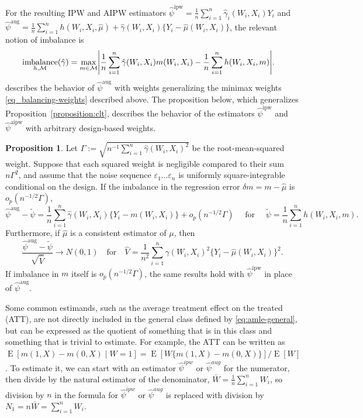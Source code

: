 \documentclass{article}
\DeclarePairedDelimiter\abs{\lvert}{\rvert}
\theoremstyle{definition}
\newtheorem{proposition}[theorem]{Proposition}
\DeclareMathOperator{\E}{E}
\newcommand{\calM}{\ensuremath{\mathcal{M}}}
\DeclareMathOperator{\imbalance}{imbalance}
\newcommand{\hgamma}{\ensuremath{\hat\gamma}}
\newcommand{\aug}{\text{aug}}
\newcommand{\<}{\langle}
\renewcommand{\>}{\rangle}
\begin{document}
For the resulting IPW and AIPW estimators $\hat\psi^{\text{ipw}} = \frac{1}{n}\sum_{i=1}^n  \hat\gamma_i(W_i,X_i) Y_i$ and $\hat\psi^{\text{aug}} = \frac{1}{n}\sum_{i=1}^n h(W_i,X_i,\hat \mu) + \hat\gamma(W_i,X_i) \{ Y_i - \hat \mu(W_i,X_i) \}$, the relevant notion of imbalance is
\begin{equation}
    \label{eq:generalizations}
    \begin{aligned}
    \imbalance_{h,\calM}(\hgamma) &= \max_{m \in \calM} \abs*{\frac{1}{n}\sum_{i=1}^n \hgamma(W_i, X_i) m(W_i, X_i) - \frac{1}{n}\sum_{i=1}^n h(W_i,X_i, m)}.
    \end{aligned}
\end{equation}
\cite{hirshberg2021augmented} describes the behavior of $\hat\psi^{\text{aug}}$ with weights generalizing the minimax weights \eqref{eq_balancing-weights} described above. The proposition below, which generalizes Proposition~\ref{proposition:clt}, describes the behavior of the estimators $\hat\psi^{\text{ipw}}$ and $\hat\psi^{\text{aipw}}$ with arbitrary design-based weights.
\begin{proposition}
\label{proposition:clt-general}
Let $\Gamma :=  \sqrt{n^{-1}\sum_{i=1}^n \hgamma(W_i, X_i)^2}$ be the root-mean-squared weight. Suppose that each squared weight is negligible compared to their sum $n\Gamma^2$, and assume that the noise sequence $\varepsilon_1 \ldots \varepsilon_n$ is uniformly square-integrable conditional on the design. If the imbalance in the regression error $\delta m = m - \hat \mu$ is $o_p(n^{-1/2} \Gamma)$,
 \begin{equation}
 \label{eq:asymptotic-linearity-amle}
 \hat\psi^{\aug} -  \tilde\psi = \frac{1}{n}\sum_{i=1}^n\hgamma(W_i,X_i) \{ Y_i - m(W_i,X_i) \} + o_p(n^{-1/2}\Gamma) \quad \text{ for } \quad \tilde\psi = \frac{1}{n}\sum_{i=1}^n h(W_i,X_i, m).
 \end{equation}
 Furthermore, if $\hat \mu$ is a consistent estimator of $\mu$, then
 \begin{equation}
 \label{eq:asymptotic-normality-amle}
  \frac{\hat\psi^{\aug} -  \tilde \psi}{\sqrt{\hat V}} \to N(0,1) \quad \text{for} \quad
 \hat V = \frac{1}{n^2}\sum_{i=1}^n \hgamma(W_i, X_i)^2 \{Y_i - \hat \mu(W_i, X_i)\}^2.
 \end{equation}
If imbalance in $m$ itself is $o_p(n^{-1/2} \Gamma)$, the same results hold with $\hat \psi^{\text{ipw}}$ in place of $\hat\psi^{\text{aug}}$.
\end{proposition}
Some common estimands, such as the average treatment effect on the treated (ATT), are not directly included in the general class defined by \eqref{eq:amle-general}, but can be expressed as the quotient of something that is in this class and something that is trivial to estimate. For example, the ATT can be written as $\E[m(1,X) - m(0,X) \mid W=1] = \E[W \{ m(1,X) - m(0,X) \}] / \E[W]$. To estimate it, we can start with an estimator  $\hat\psi^{ipw}$ or $\hat\psi^{aug}$ for the numerator, then divide by the natural estimator of the denominator, $\bar W = \frac{1}{n}\sum_{i=1}^n W_i$, so division by $n$ in the formula for $\hat\psi^{ipw}$ or $\hat\psi^{aug}$ is replaced with division by $N_1 = n\bar W = \sum_{i=1}^n W_i$.
\end{document}
